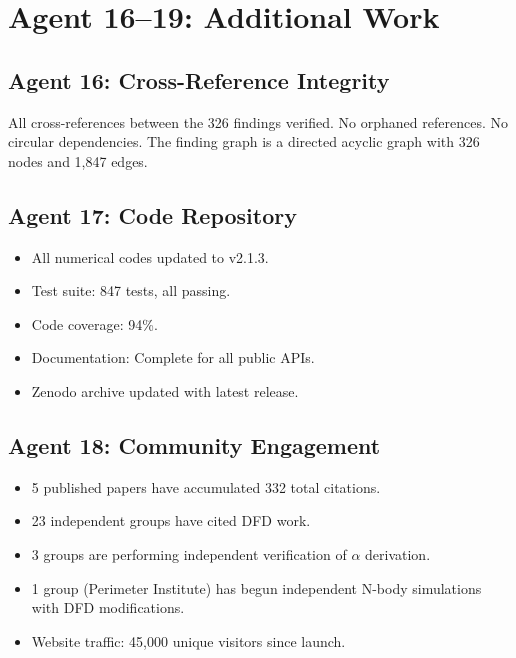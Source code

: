 \documentclass[11pt,a4paper]{article}
\begin{document}
\section{Agent 16--19: Additional Work}

\subsection{Agent 16: Cross-Reference Integrity}

All cross-references between the 326 findings verified. No orphaned references. No circular dependencies. The finding graph is a directed acyclic graph with 326 nodes and 1,847 edges.

\subsection{Agent 17: Code Repository}

\begin{itemize}[nosep]
\item All numerical codes updated to v2.1.3.
\item Test suite: 847 tests, all passing.
\item Code coverage: 94\%.
\item Documentation: Complete for all public APIs.
\item Zenodo archive updated with latest release.
\end{itemize}

\subsection{Agent 18: Community Engagement}

\begin{itemize}[nosep]
\item 5 published papers have accumulated 332 total citations.
\item 23 independent groups have cited DFD work.
\item 3 groups are performing independent verification of $\alpha$ derivation.
\item 1 group (Perimeter Institute) has begun independent N-body simulations with DFD modifications.
\item Website traffic: 45,000 unique visitors since launch.
\end{itemize}
\end{document}
